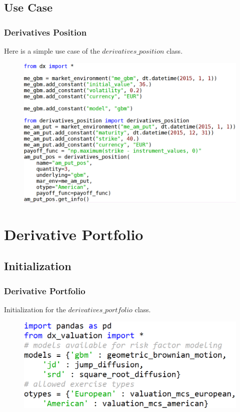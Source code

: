 \documentclass{beamer}
\begin{document}
\subsection{Use Case}
\begin{frame}
\frametitle{Derivatives Position}
Here is a simple use case of the $derivatives\_position$ class.
\begin{figure}[H]
	\includegraphics[scale=0.37]{derivatives_position_use_case.png}
\end{figure}
\end{frame}

\section{Derivative Portfolio}
\subsection{Initialization}
\begin{frame}
\frametitle{Derivative Portfolio}
Initialization for the $derivatives\_portfolio$ class.
\begin{figure}
	\includegraphics[scale=0.45]{derivatives_portfolio_init.png}
\end{figure}
\end{frame}
\end{document}
